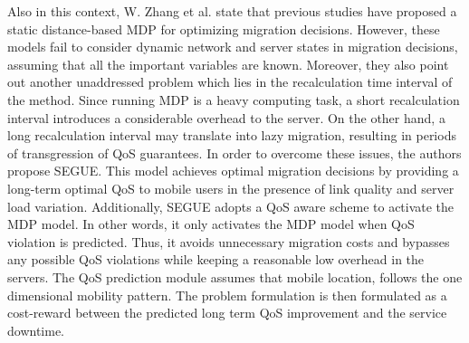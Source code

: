 \noindent\tab Also in this context, W. Zhang et al. \cite{zhang2016segue} state that previous studies have proposed a static distance-based MDP for optimizing migration decisions. However, these models fail to consider dynamic network and server states in migration decisions, assuming that all the important variables are known. Moreover, they also point out another unaddressed problem which lies in the recalculation time interval of the method. Since running MDP is a heavy computing task, a short recalculation interval introduces a considerable overhead to the server. On the other hand, a long recalculation interval may translate into lazy migration, resulting in periods of transgression of QoS guarantees. In order to overcome these issues, the authors propose SEGUE. This model achieves optimal migration decisions by providing a long-term optimal QoS to mobile users in the presence of link quality and server load variation. Additionally, SEGUE adopts a QoS aware scheme to activate the MDP model. In other words, it only activates the MDP model when QoS violation is predicted. Thus, it avoids unnecessary migration costs and bypasses any possible QoS violations while keeping a reasonable low overhead in the servers. The QoS prediction module assumes that mobile location, follows the one dimensional mobility pattern. The problem formulation is then formulated as a cost-reward between the predicted long term QoS improvement and the service downtime.\\
